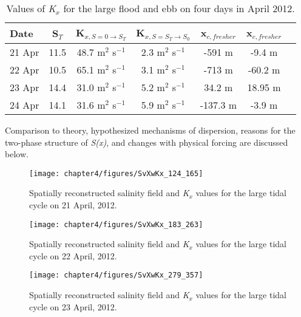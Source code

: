 \begin{table}[h]
\renewcommand{\arraystretch}{1.3}

	\begin{center}
		\begin{tabular}{| l || c | c | c | c | c | c |}
		\hline
		Date & S$_{T}$ & K$_{x,S=0 \rightarrow S_T}$ &  K$_{x,S=S_T \rightarrow S_0}$ & x$_{c,fresher}$ & x$_{c,fresher}$\\
		\hline \hline
		21 Apr & 11.5 & 48.7 m$^2$ s$^{-1}$ & 2.3 m$^2$ s$^{-1}$ & -591 m & -9.4 m\\ 
		22 Apr & 10.5 & 65.1 m$^2$ s$^{-1}$ & 3.1 m$^2$ s$^{-1}$ & -713 m & -60.2 m\\ 
		23 Apr & 14.4 & 31.0 m$^2$ s$^{-1}$ & 5.2 m$^2$ s$^{-1}$ & 34.2 m & 18.95 m\\ 
		24 Apr & 14.1 & 31.6 m$^2$ s$^{-1}$ & 5.9 m$^2$ s$^{-1}$ & -137.3 m & -3.9 m\\  \hline 
	\end{tabular}
	\caption{Values of \emph{K$_x$} for the large flood and ebb on four days  in April 2012.}\label{tab:Kxtable}
\end{center}
\end{table}


Comparison to theory, hypothesized mechanisms of dispersion, reasons for the two-phase structure of \emph{S(x)}, and changes with physical forcing are discussed below. 
\begin{figure}[hp]
\centering
	\texttt{[image: chapter4/figures/SvXwKx\_124\_165]} 
\caption{Spatially reconstructed salinity field and \emph{K$_x$} values for the large tidal cycle on 21 April, 2012. } \label{fig:Kx421}
\end{figure}

\begin{figure}[hp]
\centering
	\texttt{[image: chapter4/figures/SvXwKx\_183\_263]} 
\caption{Spatially reconstructed salinity field and \emph{K$_x$} values for the large tidal cycle on 22 April, 2012. } \label{fig:Kx422}
\end{figure}

\begin{figure}[hp]
\centering
	\texttt{[image: chapter4/figures/SvXwKx\_279\_357]} 
\caption{Spatially reconstructed salinity field and \emph{K$_x$} values for the large tidal cycle on 23 April, 2012. } \label{fig:Kx423}
\end{figure}


